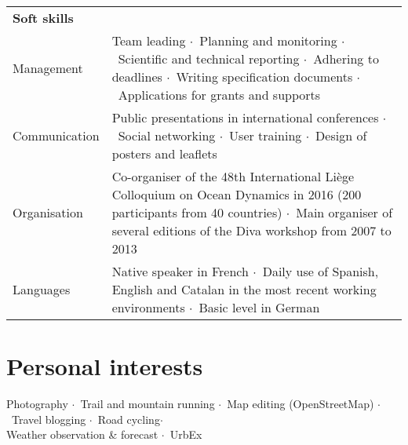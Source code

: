 \documentclass[10pt,a4paper,svgnames]{article}
\newcommand{\sepa}{$\cdot$~}
\begin{document}
\begin{tabular}{p{}| p{}}
\textbf{Soft skills} & \\

Management & Team leading \sepa Planning and monitoring \sepa Scientific and technical reporting \sepa Adhering to deadlines \sepa Writing specification documents \sepa Applications for grants and supports\\

Communication & Public presentations in international conferences \sepa Social networking \sepa User training \sepa Design of posters and leaflets\\

Organisation & Co-organiser of the 48th International Li\`{e}ge Colloquium on Ocean Dynamics in 2016 (200 participants from 40 countries) \sepa Main organiser of several editions of the Diva workshop from 2007 to 2013\\

Languages & Native speaker in French \sepa Daily use of Spanish, English and Catalan in the most recent working environments \sepa Basic level in German
\end{tabular}








\section*{Personal interests}

Photography \sepa Trail and mountain running \sepa Map editing (OpenStreetMap) \sepa Travel blogging \sepa Road cycling\sepa \\ Weather observation \& forecast \sepa UrbEx	
\end{document}
